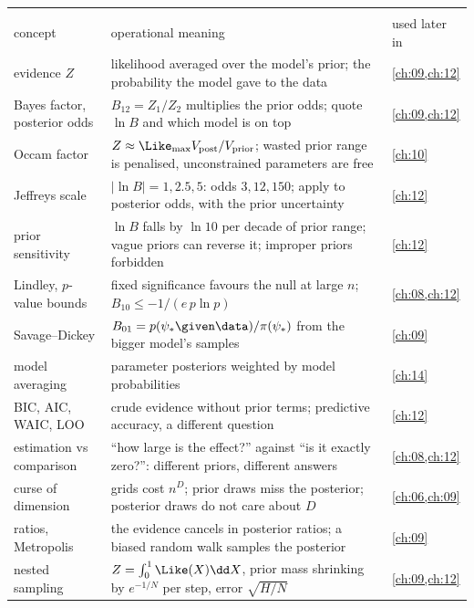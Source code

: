 \begin{center}
\small
\renewcommand{\arraystretch}{1.15}
\begin{tabularx}{\linewidth}{@{}>{\raggedright\arraybackslash}p{3.3cm}
                               >{\raggedright\arraybackslash}X
                               >{\raggedright\arraybackslash}p{2.7cm}@{}}
\toprule
\multicolumn{3}{@{}l}{\textbf{Model comparison and the need for sampling}}\\
concept & operational meaning & used later in\\\midrule
evidence $Z$ & likelihood averaged over the model's prior; the probability the model gave to the data & \cref{ch:09,ch:12}\\
Bayes factor, posterior odds & $B_{12}=Z_1/Z_2$ multiplies the prior odds; quote $\ln B$ and which model is on top & \cref{ch:09,ch:12}\\
Occam factor & $Z\approx\Like_{\max}V_{\rm post}/V_{\rm prior}$; wasted prior range is penalised, unconstrained parameters are free & \cref{ch:10}\\
Jeffreys scale & $\lvert\ln B\rvert=1,2.5,5$: odds $3,12,150$; apply to posterior odds, with the prior uncertainty & \cref{ch:12}\\
prior sensitivity & $\ln B$ falls by $\ln10$ per decade of prior range; vague priors can reverse it; improper priors forbidden & \cref{ch:12}\\
Lindley, $p$-value bounds & fixed significance favours the null at large $n$; $B_{10}\le-1/(e\,p\ln p)$ & \cref{ch:08,ch:12}\\
Savage--Dickey & $B_{01}=p(\psi_*\given\data)/\pi(\psi_*)$ from the bigger model's samples & \cref{ch:09}\\
model averaging & parameter posteriors weighted by model probabilities & \cref{ch:14}\\
BIC, AIC, WAIC, LOO & crude evidence without prior terms; predictive accuracy, a different question & \cref{ch:12}\\
estimation vs comparison & ``how large is the effect?'' against ``is it exactly zero?'': different priors, different answers & \cref{ch:08,ch:12}\\
curse of dimension & grids cost $n^D$; prior draws miss the posterior; posterior draws do not care about $D$ & \cref{ch:06,ch:09}\\
ratios, Metropolis & the evidence cancels in posterior ratios; a biased random walk samples the posterior & \cref{ch:09}\\
nested sampling & $Z=\int_0^1\Like(X)\dd X$, prior mass shrinking by $e^{-1/N}$ per step, error $\sqrt{H/N}$ & \cref{ch:09,ch:12}\\
\bottomrule
\end{tabularx}
\end{center}
\clearpage
\flushbottom
  